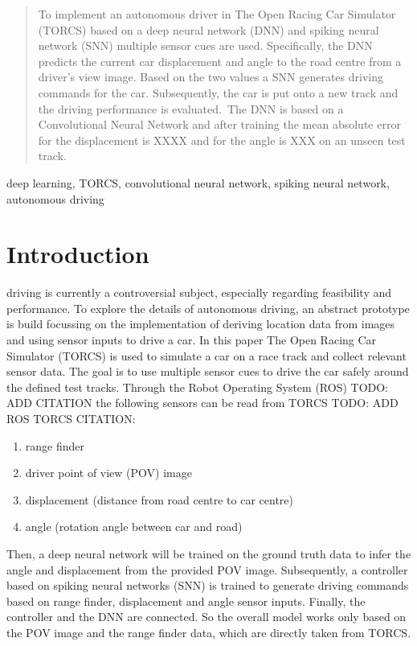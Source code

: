 \documentclass[10pt,a4paper,twoside,journal]{IEEEtran}
\begin{document}
\begin{abstract}
	To implement an autonomous driver in The Open Racing Car Simulator (TORCS)
	based on a deep neural network (DNN) and spiking neural network (SNN) multiple
	sensor cues are used. Specifically, the DNN predicts the current car displacement
	and angle to the road centre from a driver's view image. Based on the two values
	a SNN generates driving commands for the car. Subsequently, the car is put onto a 
	new track and the driving performance is evaluated.\
	The DNN is based on a Convolutional Neural Network and after training the mean 
	absolute error for the displacement is XXXX and for the angle is XXX on an
	unseen test track.
\end{abstract}

\begin{IEEEkeywords}
	deep learning, TORCS, convolutional neural network, spiking neural network, autonomous driving
\end{IEEEkeywords}

%
%
\section{Introduction}
\label{sc:intro}

 driving is currently a controversial subject, especially 
regarding feasibility and performance. To explore the details of autonomous driving, an abstract prototype is build focussing on the  implementation of deriving location data from images and using sensor inputs to drive a car.
In this paper The Open Racing Car Simulator (TORCS) is used
to simulate a car on a race track and collect relevant sensor data. The goal is to use multiple sensor cues to drive the car safely around the defined test tracks. Through the Robot Operating System (ROS) TODO: ADD CITATION the following sensors can be read from TORCS TODO: ADD ROS TORCS CITATION: 
\begin{enumerate}
	\item range finder
	\item driver point of view (POV) image
	\item displacement (distance from road centre to car centre)
	\item angle (rotation angle between car and road)
\end{enumerate}
Then, a deep neural network will be trained on the ground truth data to infer the angle and displacement from the provided POV image. Subsequently, a controller based on spiking neural networks (SNN) is trained to generate driving commands based on range finder, displacement and angle sensor inputs. Finally, the controller and the DNN are connected. So the overall model works only based on the POV image and the range finder data, which are directly taken from TORCS.
\end{document}

